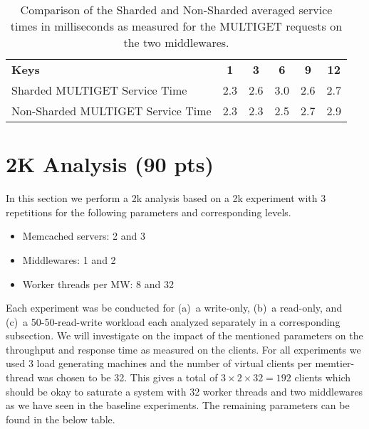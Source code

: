 \documentclass[11pt,a4paper]{article}
\let\tb\textbf
\begin{document}
\begin{table}[H]
\centering
    \scriptsize{
		\begin{tabular}{|l||c|c|c|c|c|} \hline 
		\tb{Keys}                           & \tb{1}    &      \tb{3}     &     \tb{6}       &   \tb{9}  &       \tb{12}   \\ \hhline{|=|=|=|=|=|=|}  
        Sharded MULTIGET Service Time       &   2.3    &        2.6   &      3.0    &     2.6   &      2.7 \\ \hline
        Non-Sharded MULTIGET Service Time   &   2.3    &    2.3     &    2.5       &  2.7        & 2.9      \\ \hline
		\end{tabular}
	}
    \caption{Comparison of the Sharded and Non-Sharded averaged service times in milliseconds as measured for the MULTIGET requests on the two middlewares.}
    \label{tbl:read:summary}
\end{table}


\section{2K Analysis (90 pts)}

In this section we perform a 2k analysis based on a 2k experiment with 3 repetitions for the following parameters and corresponding levels.

\begin{itemize}
	\item Memcached servers: 2 and 3
	\item Middlewares: 1 and 2
	\item Worker threads per MW: 8 and 32
\end{itemize}

Each experiment was be conducted for (a)~a write-only, (b)~a read-only, and (c)~a 50-50-read-write workload each analyzed separately in a corresponding subsection. We will investigate on the impact of the mentioned parameters on the throughput and response time as measured on the clients.  For all experiments we used 3 load generating machines and the number of virtual clients per memtier-thread was chosen to be 32. This gives a total of $3 \times 2 \times 32 = 192$ clients which should be okay to saturate a system with 32 worker threads and two middlewares as we have seen in the baseline experiments. The remaining parameters can be found in the below table.

\end{document}
